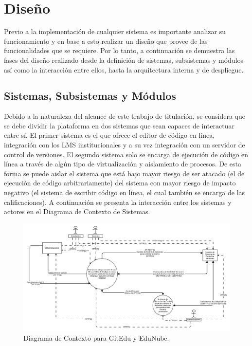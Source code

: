 \section{Diseño}
Previo a la implementación de cualquier sistema es importante analizar su funcionamiento y en base a esto realizar un diseño que provee de las funcionalidades que se requiere. Por lo tanto, a continuación se demuestra las fases del diseño realizado desde la definición de sistemas, subsistemas y módulos así como la interacción entre ellos, hasta la arquitectura interna y de despliegue.

\subsection{Sistemas, Subsistemas y Módulos}
      
Debido a la naturaleza del alcance de este trabajo de titulación, se considera que se debe dividir la plataforma en dos sistemas que sean capaces de interactuar entre sí. El primer sistema es el que ofrece el editor de código en línea, integración con los LMS  institucionales y a su vez integración con un servidor de control de versiones. El segundo sistema solo se encarga de ejecución de código en línea a través de algún tipo de virtualización y aislamiento de procesos. De esta forma se puede aislar el sistema que está bajo mayor riesgo de ser atacado (el de ejecución de código arbitrariamente) del sistema con mayor riesgo de impacto negativo (el sistema de escribir código en línea, el cual también se encarga de las calificaciones). A continuación se presenta la interacción entre los sistemas y actores en el Diagrama de Contexto de Sistemas.

\begin{landscape}

	\begin{figure}
	  \begin{center}
	    \includegraphics[width=1.7\textwidth]{Figures/contexto.png}
	  \end{center}
	  \caption{Diagrama de Contexto para GitEdu y EduNube.}
	  \label{context}
	\end{figure}

\end{landscape}

